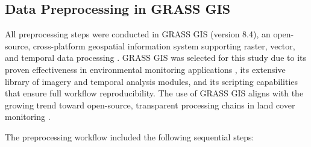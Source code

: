 \documentclass[remotesensing,article,submit,pdftex,moreauthors]{Definitions/mdpi}
\begin{document}
\subsection{Data Preprocessing in GRASS GIS}

All preprocessing steps were conducted in GRASS GIS (version 8.4), an open-source, cross-platform geospatial information system supporting raster, vector, and temporal data processing \citep{Neteler2012, MitasovaNeteler2004}. GRASS GIS was selected for this study due to its proven effectiveness in environmental monitoring applications \citep{Lemenkova2023GRASS, Lemenkova2025Morocco}, its extensive library of imagery and temporal analysis modules, and its scripting capabilities that ensure full workflow reproducibility. The use of GRASS GIS aligns with the growing trend toward open-source, transparent processing chains in land cover monitoring \citep{Gatis2022, Rocchini2016}.

The preprocessing workflow included the following sequential steps:
\end{document}

